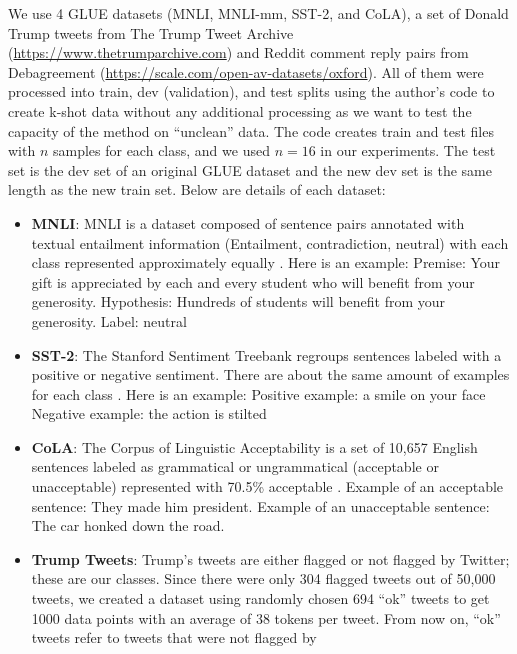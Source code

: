 We use 4 GLUE datasets (MNLI, MNLI-mm, SST-2, and CoLA), a set of Donald Trump tweets from The Trump Tweet Archive (\url{https://www.thetrumparchive.com}) and Reddit comment reply pairs from Debagreement (\url{https://scale.com/open-av-datasets/oxford})\citep{pougue2021debagreement}. All of them were processed into train, dev (validation), and test splits using the author's code to create k-shot data without any additional processing as we want to test the capacity of the method on ``unclean'' data. The code creates train and test files with \(n\) samples for each class, and we used \(n=16\) in our experiments. The test set is the dev set of an original GLUE dataset and the new dev set is the same length as the new train set. Below are details of each dataset:
\begin{itemize}
    \item \textbf{MNLI}: MNLI is a dataset composed of sentence pairs annotated with textual entailment information (Entailment, contradiction, neutral) with each class represented approximately equally \citep{MNLI}. Here is an example:
    \hfill \break \break
    Premise: Your gift is appreciated by each and every student who will benefit from your generosity. 
    \hfill \break
    Hypothesis: Hundreds of students will benefit from your generosity.
    \hfill \break
    Label: neutral
    \item \textbf{SST-2}: The Stanford Sentiment Treebank regroups sentences labeled with a positive or negative sentiment. There are about the same amount of examples for each class \citep{sst2}. Here is an example:
    \hfill \break \break
    Positive example: a smile on your face
    \hfill \break
    Negative example: the action is stilted
    \item \textbf{CoLA}: The Corpus of Linguistic Acceptability is a set of 10,657 English sentences labeled as grammatical or ungrammatical (acceptable or unacceptable) represented with 70.5\% acceptable \citep{warstadt-etal-2019-neural}.
    \hfill \break \break
    Example of an acceptable sentence: They made him president.
    \hfill \break
    Example of an unacceptable sentence: The car honked down the road.
    \item \textbf{Trump Tweets}: Trump's tweets are either flagged or not flagged by Twitter; these are our classes. Since there were only 304 flagged tweets out of 50,000 tweets, we created a dataset using randomly chosen 694 ``ok'' tweets to get 1000 data points with an average of 38 tokens per tweet. From now on, ``ok'' tweets refer to tweets that were not flagged by 

\end{itemize}
